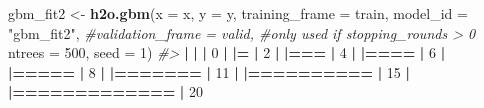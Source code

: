 \documentclass[]{book}
\newenvironment{Shaded}{\begin{snugshade}}{\end{snugshade}}
\newcommand{\CommentTok}[1]{\textcolor[rgb]{0.56,0.35,0.01}{\textit{#1}}}
\newcommand{\DataTypeTok}[1]{\textcolor[rgb]{0.13,0.29,0.53}{#1}}
\newcommand{\DecValTok}[1]{\textcolor[rgb]{0.00,0.00,0.81}{#1}}
\newcommand{\ErrorTok}[1]{\textcolor[rgb]{0.64,0.00,0.00}{\textbf{#1}}}
\newcommand{\KeywordTok}[1]{\textcolor[rgb]{0.13,0.29,0.53}{\textbf{#1}}}
\newcommand{\NormalTok}[1]{#1}
\newcommand{\OperatorTok}[1]{\textcolor[rgb]{0.81,0.36,0.00}{\textbf{#1}}}
\newcommand{\StringTok}[1]{\textcolor[rgb]{0.31,0.60,0.02}{#1}}
\begin{document}
\begin{Shaded}
\begin{Highlighting}[]
\NormalTok{gbm_fit2 <-}\StringTok{ }\KeywordTok{h2o.gbm}\NormalTok{(}\DataTypeTok{x =}\NormalTok{ x,}
                    \DataTypeTok{y =}\NormalTok{ y,}
                    \DataTypeTok{training_frame =}\NormalTok{ train,}
                    \DataTypeTok{model_id =} \StringTok{"gbm_fit2"}\NormalTok{,}
                    \CommentTok{#validation_frame = valid,  #only used if stopping_rounds > 0}
                    \DataTypeTok{ntrees =} \DecValTok{500}\NormalTok{,}
                    \DataTypeTok{seed =} \DecValTok{1}\NormalTok{)}
\CommentTok{#> }
  \OperatorTok{|}\StringTok{                                                                       }
\StringTok{  }\ErrorTok{|}\StringTok{                                                                 }\ErrorTok{|}\StringTok{   }\DecValTok{0}\NormalTok{%}
  \OperatorTok{|}\StringTok{                                                                       }
\StringTok{  }\ErrorTok{|=}\StringTok{                                                                }\ErrorTok{|}\StringTok{   }\DecValTok{2}\NormalTok{%}
  \OperatorTok{|}\StringTok{                                                                       }
\StringTok{  }\ErrorTok{|===}\StringTok{                                                              }\ErrorTok{|}\StringTok{   }\DecValTok{4}\NormalTok{%}
  \OperatorTok{|}\StringTok{                                                                       }
\StringTok{  }\ErrorTok{|====}\StringTok{                                                             }\ErrorTok{|}\StringTok{   }\DecValTok{6}\NormalTok{%}
  \OperatorTok{|}\StringTok{                                                                       }
\StringTok{  }\ErrorTok{|=====}\StringTok{                                                            }\ErrorTok{|}\StringTok{   }\DecValTok{8}\NormalTok{%}
  \OperatorTok{|}\StringTok{                                                                       }
\StringTok{  }\ErrorTok{|=======}\StringTok{                                                          }\ErrorTok{|}\StringTok{  }\DecValTok{11}\NormalTok{%}
  \OperatorTok{|}\StringTok{                                                                       }
\StringTok{  }\ErrorTok{|==========}\StringTok{                                                       }\ErrorTok{|}\StringTok{  }\DecValTok{15}\NormalTok{%}
  \OperatorTok{|}\StringTok{                                                                       }
\StringTok{  }\ErrorTok{|=============}\StringTok{                                                    }\ErrorTok{|}\StringTok{  }\DecValTok{20}\NormalTok{%}
}}}}}}}}
\end{Highlighting}
\end{Shaded}
\end{document}
